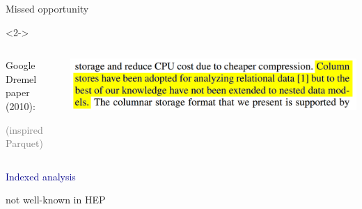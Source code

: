 \documentclass[aspectratio=169]{beamer}
\begin{document}
\begin{frame}{Missed opportunity}
\begin{center}
\end{center}
\begin{uncoverenv}<2->
\begin{columns}
\begin{center}
\small
{\Large Google Dremel paper (2010):}

\textcolor{gray}{(inspired Parquet)}
\end{center}

\includegraphics[width=\linewidth]{dremel-paper-cropped.png}
\end{columns}
\end{uncoverenv}
\end{frame}

\begin{frame}{}
\huge
\vspace{0.5 cm}
\begin{center}
\textcolor{darkblue}{Indexed analysis}

\large
\vspace{0.5 cm}
not well-known in HEP
\end{center}
\end{frame}
\end{document}
